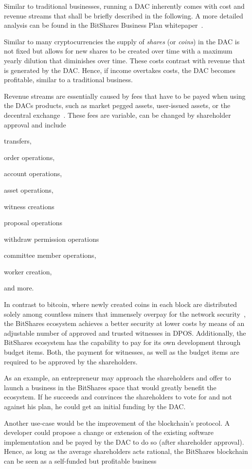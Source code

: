 \label{sec:token:supply}

Similar to traditional businesses, running a DAC inherently comes with cost and
revenue streams that shall be briefly described in the following. A more
detailed analysis can be found in the BitShares Business Plan
whitepaper~\cite{}.

Similar to many cryptocurrencies the supply of \emph{shares} (or \emph{coins})
in the DAC is not fixed but allows for new shares to be created over time with
a maximum yearly dilution that diminishes over time. These costs contrast with
revenue that is generated by the DAC. Hence, if income overtakes costs, the DAC
becomes profitable, similar to a traditional business.

Revenue streams are essentially caused by fees that have to be payed when using
the DACs products, such as market pegged assets, user-issued assets, or the
decentral exchange~\cite{bts:financial}. These fees are variable, can be
changed by shareholder approval and include
\begin{inparaenum}[(a)]
 \item transfers,
 \item order operations,
 \item account operations,
 \item asset operations,
 \item witness creations
 \item proposal operations
 \item withdraw permission operations
 \item committee member operations,
 \item worker creation,
\end{inparaenum}
and more.

In contrast to bitcoin, where newly created coins in each block are distributed
solely among countless miners that immensely overpay for the network
security~\cite{ltb:dac}, the BitShares ecosystem achieves a better security at
lower costs by means of an adjustable number of approved and trusted witnesses
in DPOS. Additionally, the BitShares ecosystem has the capability to pay for
its own development through budget items. Both, the payment for witnesses, as
well as the budget items are required to be approved by the shareholders.

As an example, an entrepreneur may approach the shareholders and offer to
launch a business in the BitShares space that would greatly benefit the
ecosystem. If he succeeds and convinces the shareholders to vote for and not
against his plan, he could get an initial funding by the DAC.

Another use-case would be the improvement of the blockchain's protocol. A
developer could propose a change or extension of the existing software
implementation and be payed by the DAC to do so (after shareholder approval).
Hence, as long as the average shareholders acts rational, the BitShares
blockchain can be seen as a self-funded but profitable business

